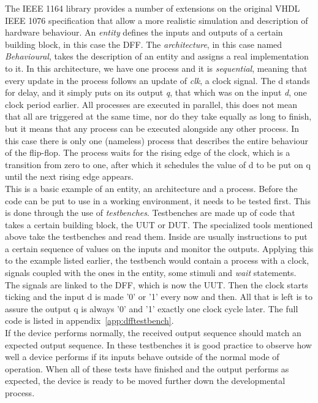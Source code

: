 \documentclass[11pt,british]{article}
\begin{document}
The \gls{IEEE} 1164 library provides a number of extensions on the original \gls{VHDL} IEEE 1076 specification that allow a more realistic simulation and description of hardware behaviour.\cite{IEEE1164} An \emph{entity} defines the inputs and outputs of a certain building block, in this case the \gls{DFF}. The \emph{architecture}, in this case named \emph{Behavioural}, takes the description of an entity and assigns a real implementation to it. In this architecture, we have one process and it is \emph{sequential}, meaning that every update in the process follows an update of \emph{clk}, a clock signal. The d stands for delay, and it simply puts on its output \emph{q}, that which was on the input \emph{d}, one clock period earlier. All processes are executed in parallel, this does not mean that all are triggered at the same time, nor do they take equally as long to finish, but it means that any process can be executed alongside any other process. In this case there is only one (nameless) process that describes the entire behaviour of the flip-flop. The process waits for the rising edge of the clock, which is a transition from zero to one, after which it schedules the value of d to be put on q until the next rising edge appears.
\\[\baselineskip]
This is a basic example of an entity, an architecture and a process. Before the code can be put to use in a working environment, it needs to be tested first. This is done through the use of \emph{testbenches}.\cite{bergeron00} Testbenches are made up of code that takes a certain building block, the \gls{UUT} or \gls{DUT}. The specialized tools mentioned above take the testbenches and read them. Inside are usually instructions to put a certain sequence of values on the inputs and monitor the outputs.\cite{vhdltestbench} Applying this to the example listed earlier, the testbench would contain a process with a clock, signals coupled with the ones in the entity, some stimuli and \emph{wait} statements. The signals are linked to the DFF, which is now the UUT. Then the clock starts ticking and the input d is made '0' or '1' every now and then. All that is left is to assure the output q is always '0' and '1' exactly one clock cycle later. The full code is listed in appendix~\ref{app:dfftestbench}.
\\[\baselineskip]
If the device performs normally, the received output sequence should match an expected output sequence. In these testbenches it is good practice to observe how well a device performs if its inputs behave outside of the normal mode of operation. When all of these tests have finished and the output performs as expected, the device is ready to be moved further down the developmental process.\cite{vhdldebug}
\end{document}
